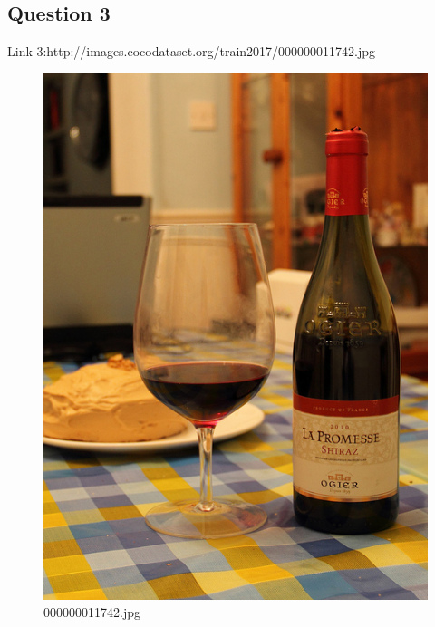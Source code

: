 \subsection{Question 3}
Link 3:http://images.cocodataset.org/train2017/000000011742.jpg
    \begin{figure}[h]
        \centering
        \includegraphics[width=0.8\linewidth]{../image set/easy/000000011742.jpg}
        \caption{000000011742.jpg}
    \end{figure}
